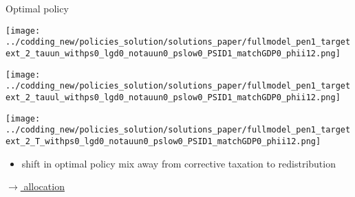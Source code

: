 \documentclass[11pt,aspectratio=169]{beamer}
\begin{document}
	\begin{frame}{ Optimal policy}
		\hypertarget{backmain}{}
		\vspace{4mm}
		\centering
		\begin{minipage}[]{0.32\textwidth}
			\texttt{[image: ../codding\_new/policies\_solution/solutions\_paper/fullmodel\_pen1\_targetext\_2\_tauun\_withps0\_lgd0\_notauun0\_pslow0\_PSID1\_matchGDP0\_phii12.png]}
		\end{minipage}
		\begin{minipage}[]{0.32\textwidth}
			\texttt{[image: ../codding\_new/policies\_solution/solutions\_paper/fullmodel\_pen1\_targetext\_2\_tauul\_withps0\_lgd0\_notauun0\_pslow0\_PSID1\_matchGDP0\_phii12.png]}
		\end{minipage}
		\begin{minipage}[]{0.32\textwidth}
			\texttt{[image: ../codding\_new/policies\_solution/solutions\_paper/fullmodel\_pen1\_targetext\_2\_T\_withps0\_lgd0\_notauun0\_pslow0\_PSID1\_matchGDP0\_phii12.png]}
		\end{minipage}
		\vspace{5mm}
		\begin{itemize}[<+-| alert@+>]
			\item shift in optimal policy mix away from corrective taxation to redistribution 			     
		\end{itemize}
		
			\vspace{11mm}
			\hfill
			\hyperlink{backallo}{\tiny{$\rightarrow$ allocation}}
			\hypertarget{backopt}{}
	\end{frame}
	
\end{document}

